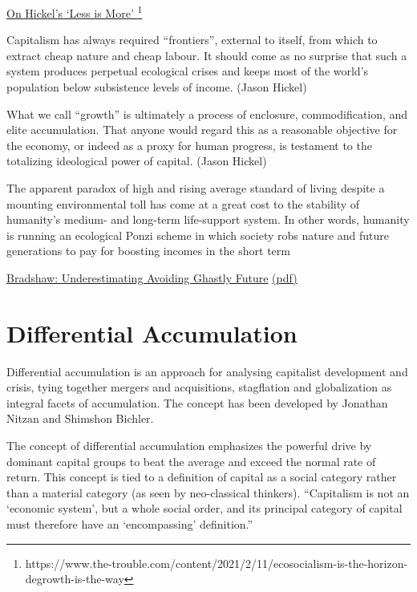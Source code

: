\documentclass[
]{book}
\begin{document}
\href{https://www.the-trouble.com/content/2021/2/11/ecosocialism-is-the-horizon-degrowth-is-the-way}{On Hickel's `Less is More' \footnote{\url{https://www.the-trouble.com/content/2021/2/11/ecosocialism-is-the-horizon-degrowth-is-the-way}}}

Capitalism has always required ``frontiers'', external to itself,
from which to extract cheap nature and cheap labour.
It should come as no surprise that such a system produces
perpetual ecological crises and keeps most of the world's
population below subsistence levels of income. (Jason Hickel)

What we call ``growth'' is ultimately a process of enclosure, commodification,
and elite accumulation.
That anyone would regard this as a reasonable objective for the economy,
or indeed as a proxy for human progress,
is testament to the totalizing ideological power of capital. (Jason Hickel)

The apparent paradox of high and rising average
standard of living despite a mounting environmental toll has
come at a great cost to the stability of humanity's medium-
and long-term life-support system. In other words, humanity is
running an ecological Ponzi scheme in which society robs nature
and future generations to pay for boosting incomes in the short
term

\href{https://www.frontiersin.org/articles/10.3389/fcosc.2020.615419/full}{Bradshaw: Underestimating Avoiding Ghastly Future}
\href{/pdf/Bradshaw_2020_Underestimating.pdf}{(pdf)}

\hypertarget{differential-accumulation}{%
\section{Differential Accumulation}\label{differential-accumulation}}

Differential accumulation is an approach for analysing capitalist development and crisis, tying together mergers and acquisitions, stagflation and globalization as integral facets of accumulation. The concept has been developed by Jonathan Nitzan and Shimshon Bichler.

The concept of differential accumulation emphasizes the powerful drive by dominant capital groups to beat the average and exceed the normal rate of return. This concept is tied to a definition of capital as a social category rather than a material category (as seen by neo-classical thinkers). ``Capitalism is not an `economic system', but a whole social order, and its principal category of capital must therefore have an `encompassing' definition.''
\end{document}
